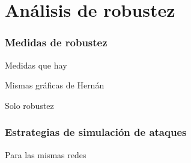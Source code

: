 \section{Análisis de robustez}

\subsubsection{Medidas de robustez}


Medidas que hay 

Mismas gráficas de Hernán

Solo robustez

\subsubsection{Estrategias de simulación de ataques}


Para las mismas redes